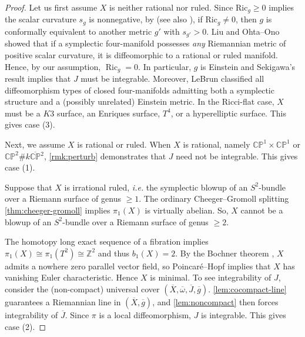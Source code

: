 \documentclass[11pt,twoside]{amsart}
\DeclareMathOperator{\Ric}{Ric}
\newcommand{\Z}{\mathbb{Z}}
\renewcommand{\tilde}{\widetilde}
\begin{document}
\begin{proof}
Let us first assume $X$ is neither rational nor ruled. Since $\text{Ric}_g\geq 0$ implies the scalar curvature $s_g$ is nonnegative, by \cite{KW75} (see also \cite[Theorem 2.3]{GL80}), if $\text{Ric}_g\neq 0$, then $g$ is conformally equivalent to another metric $g'$ with $s_{g'}>0$. Liu \cite{Liu96} and Ohta--Ono \cite{OhtaOno} showed that if a symplectic four-manifold possesses \emph{any} Riemannian metric of positive scalar curvature, it is diffeomorphic to a rational or ruled manifold. Hence, by our assumption, $\Ric_g=0$. In particular, $g$ is Einstein and Sekigawa's result \cite{Sekigawa} implies that $J$ must be integrable. Moreover, LeBrun \cite[Theorem B]{LeBrun} classified all diffeomorphism types of closed four-manifolds admitting both a symplectic structure and a (possibly unrelated) Einstein metric. In the Ricci-flat case, $X$ must be a $K3$ surface, an Enriques surface,
$T^4$, or a hyperelliptic surface. This gives case (3).

Next, we assume $X$ is rational or ruled. When $X$ is rational, namely $\mathbb{CP}^1\times\mathbb{CP}^1$ or  $\mathbb{CP}^2\#k\overline{\mathbb{CP}}{}^2$,  \autoref{rmk:perturb} demonstrates that $J$ need not be integrable. This gives case (1).


Suppose that $X$ is irrational ruled, \emph{i.e.} the symplectic blowup of an $S^2$-bundle over a Riemann surface of genus $\ge 1$. The ordinary Cheeger--Gromoll splitting \autoref{thm:cheeger-gromoll} implies $\pi_1(X)$ is virtually abelian. So, $X$ cannot be a blowup of an $S^2$-bundle over a Riemann surface of genus $\geq 2$. 

The homotopy long exact sequence of a fibration implies $\pi_1(X) \cong \pi_1(T^2) \cong \Z^2$ and thus $b_1(X)=2$. By the Bochner theorem \cite[Theorem 9.2.3]{Petersen2016}, $X$ admits a nowhere zero parallel vector field, so Poincar\'e--Hopf implies that $X$ has vanishing Euler characteristic. Hence $X$ is minimal. 
To see integrability of $J$, consider the (non-compact) universal cover $(\overline{X},\overline{\omega},\overline{J},\overline{g})$.   \autoref{lem:cocompact-line} guarantees a Riemannian line in $(\overline{X},\overline{g})$, and \autoref{lem:noncompact} then forces integrability of $\overline{J}$. Since $\pi$ is a local diffeomorphism, $J$ is integrable. This gives case (2).
\end{proof}
\end{document}
